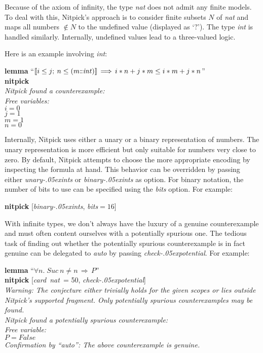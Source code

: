 \documentclass[a4paper,12pt]{article}
\def\Colon{\mathord{:\mkern-1.5mu:}}
\def\unk{{?}}
\renewcommand\_{\hbox{\textunderscore\kern-.05ex}}
\begin{document}
Because of the axiom of infinity, the type \textit{nat} does not admit any
finite models. To deal with this, Nitpick's approach is to consider finite
subsets $N$ of \textit{nat} and maps all numbers $\notin N$ to the undefined
value (displayed as `$\unk$'). The type \textit{int} is handled similarly.
Internally, undefined values lead to a three-valued logic.

Here is an example involving \textit{int\/}:

\prew
\textbf{lemma} ``$\lbrakk i \le j;\> n \le (m{\Colon}\mathit{int})\rbrakk \,\Longrightarrow\, i * n + j * m \le i * m + j * n$'' \\
\textbf{nitpick} \\[2\smallskipamount]
\slshape Nitpick found a counterexample: \\[2\smallskipamount]
\hbox{}\qquad Free variables: \nopagebreak \\
\hbox{}\qquad\qquad $i = 0$ \\
\hbox{}\qquad\qquad $j = 1$ \\
\hbox{}\qquad\qquad $m = 1$ \\
\hbox{}\qquad\qquad $n = 0$
\postw

Internally, Nitpick uses either a unary or a binary representation of numbers.
The unary representation is more efficient but only suitable for numbers very
close to zero. By default, Nitpick attempts to choose the more appropriate
encoding by inspecting the formula at hand. This behavior can be overridden by
passing either \textit{unary\_ints} or \textit{binary\_ints} as option. For
binary notation, the number of bits to use can be specified using
the \textit{bits} option. For example:

\prew
\textbf{nitpick} [\textit{binary\_ints}, \textit{bits}${} = 16$]
\postw

With infinite types, we don't always have the luxury of a genuine counterexample
and must often content ourselves with a potentially spurious one. The tedious
task of finding out whether the potentially spurious counterexample is in fact
genuine can be delegated to \textit{auto} by passing \textit{check\_potential}.
For example:

\prew
\textbf{lemma} ``$\forall n.\; \textit{Suc}~n \mathbin{\not=} n \,\Longrightarrow\, P$'' \\
\textbf{nitpick} [\textit{card~nat}~= 50, \textit{check\_potential}] \\[2\smallskipamount]
\slshape Warning: The conjecture either trivially holds for the given scopes or lies outside Nitpick's supported
fragment. Only potentially spurious counterexamples may be found. \\[2\smallskipamount]
Nitpick found a potentially spurious counterexample: \\[2\smallskipamount]
\hbox{}\qquad Free variable: \nopagebreak \\
\hbox{}\qquad\qquad $P = \textit{False}$ \\[2\smallskipamount]
Confirmation by ``\textit{auto}'': The above counterexample is genuine.
\postw
\end{document}
